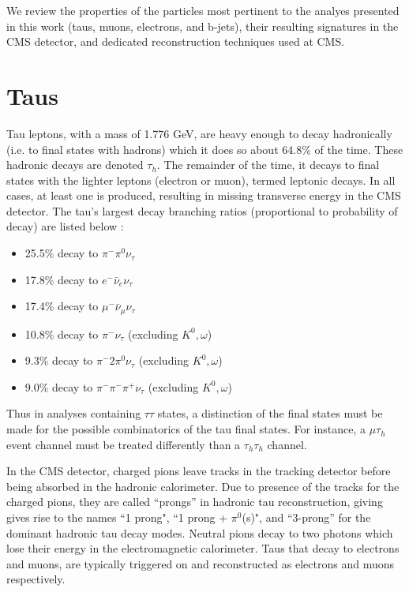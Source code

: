 We review the properties of the particles most pertinent to the analyes presented in this work (taus, muons, electrons, and b-jets), their resulting signatures in the CMS detector, and dedicated reconstruction techniques used at CMS.

\section{Taus}
Tau leptons, with a mass of 1.776 GeV, are heavy enough to decay hadronically (i.e. to final states with hadrons) which it does so about 64.8\% of the time. These hadronic decays are denoted $\tau_{h}$. The remainder of the time, it decays to final states with the lighter leptons (electron or muon), termed leptonic decays. In all cases, at least one is produced, resulting in missing transverse energy in the CMS detector. The tau's largest decay branching ratios (proportional to probability of decay) are listed below \citep{workman_review_2022}: 
\begin{itemize}
    \item 25.5\% decay to $\pi^- \pi^0 \nu_{\tau}$
    \item 17.8\% decay to $e^- \bar{\nu}_e \nu_{\tau}$
    \item 17.4\% decay to $\mu^- \bar{\nu}_\mu \nu_{\tau}$
    \item 10.8\% decay to $\pi^- \nu_{\tau}$ (excluding $K^0, \omega$)
    \item 9.3\% decay to $\pi^- 2\pi^0 \nu_{\tau}$ (excluding $K^0, \omega$)
    \item 9.0\% decay to $\pi^- \pi^- \pi^+ \nu_{\tau}$ (excluding $K^0, \omega$)
\end{itemize}

Thus in analyses containing $\tau\tau$ states, a distinction of the final states must be made for the possible combinatorics of the tau final states. For instance, a $\mu\tau_{h}$ event channel must be treated differently than a $\tau_{h}\tau_{h}$ channel.

In the CMS detector, charged pions leave tracks in the tracking detector before being absorbed in the hadronic calorimeter. Due to presence of the tracks for the charged pions, they are called ``prongs'' in hadronic tau reconstruction, giving gives rise to the names ``1 prong", ``1 prong + $\pi^0$(s)", and ``3-prong'' for the dominant hadronic tau decay modes. Neutral pions decay to two photons which lose their energy in the electromagnetic calorimeter. Taus that decay to electrons and muons, are typically triggered on and reconstructed as electrons and muons respectively. 

